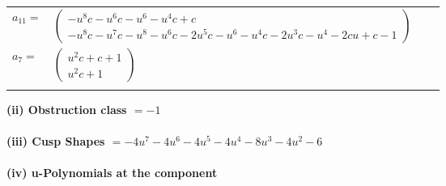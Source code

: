 \documentclass[1p]{elsarticle_modified}
\theoremstyle{definition}
\begin{document}
\begin{tabular}{m{7pt} m{180pt} m{7pt} m{180pt} }
\flushright $a_{11}=$&$\begin{pmatrix}- u^8 c- u^6 c- u^6- u^4 c+c\\- u^8 c- u^7 c- u^8- u^6 c-2 u^5 c- u^6- u^4 c-2 u^3 c- u^4-2 c u+c-1\end{pmatrix}$ \\
\flushright $a_{7}=$&$\begin{pmatrix}u^2 c+c+1\\u^2 c+1\end{pmatrix}$\\&\end{tabular}
\flushleft \textbf{(ii) Obstruction class $= -1$}\\~\\
\flushleft \textbf{(iii) Cusp Shapes $= -4 u^7-4 u^6-4 u^5-4 u^4-8 u^3-4 u^2-6$}\\~\\
\newpage\renewcommand{\arraystretch}{1}
\flushleft \textbf{(iv) u-Polynomials at the component}\newline \\
\end{document}
